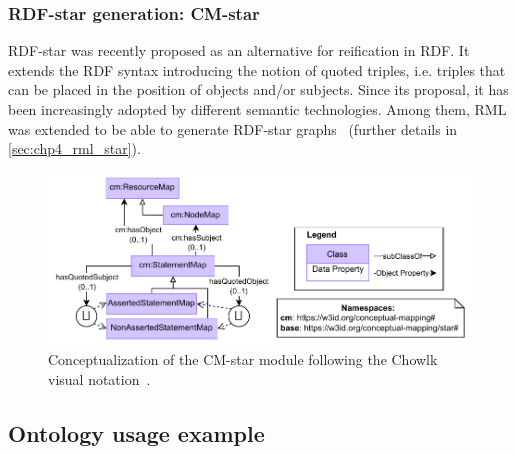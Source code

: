 \subsubsection{RDF-star generation: CM-star}
RDF-star was recently proposed as an alternative for reification in RDF. It extends the RDF syntax introducing the notion of quoted triples, i.e. triples that can be placed in the position of objects and/or subjects. Since its proposal, it has been increasingly adopted by different semantic technologies. Among them, RML was extended to be able to generate RDF-star graphs~\citep{iglesias2022rmlstar} (further details in \cref{sec:chp4_rml_star}). 

\begin{figure}[!t]
\centering
\includegraphics[width=0.8\linewidth]{figures/chp4-2_cm-star.pdf}
\caption[CM-star module]{Conceptualization of the CM-star module following the Chowlk visual notation~\citep{feria2022chowlk}.}
\label{fig:chp4-2_star-ext}
\end{figure}

\subsection{Ontology usage example}\label{sec:cm_example} 



